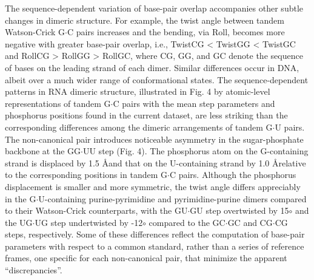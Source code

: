 The  sequence-dependent variation of  base-pair overlap  accompanies
other  subtle changes  in dimeric  structure. For  example,  the twist
angle between  tandem Watson-Crick  G$\cdot$C pairs increases  and the
bending,  via Roll,  becomes  more negative  with  greater base-pair
overlap,  i.e., TwistCG  < TwistGG  < TwistGC  and RollCG  >  RollGG >
RollGC,  where CG,  GG, and  GC denote  the sequence  of bases  on the
leading strand of each dimer. Similar differences occur in DNA, albeit
over  a  much  wider  range  of  conformational  states.  The
sequence-dependent patterns in RNA dimeric structure, illustrated in
Fig. 4 by atomic-level  representations of tandem G$\cdot$C pairs with
the mean step parameters and phosphorus positions found in the current
dataset, are less striking  than the corresponding differences among
the dimeric arrangements of  tandem G$\cdot$U pairs. The non-canonical
pair introduces  noticeable asymmetry in  the sugar-phosphate backbone
at  the  GG$\cdot$UU  step  (Fig.  4).  The  phosphorus  atom  on  the
G-containing strand is displaced by 1.5 \AA and that on the U-containing
strand  by 1.0  \AA relative  to the  corresponding positions  in tandem
G$\cdot$C pairs. Although the phosphorus displacement is smaller and
more  symmetric,  the  twist   angle  differs  appreciably  in  the
G$\cdot$U-containing purine-pyrimidine and pyrimidine-purine dimers
compared to their Watson-Crick counterparts, with the GU$\cdot$GU step
overtwisted  by 15$\circ$  and  the UG$\cdot$UG  step undertwisted  by
-12$\circ$ compared to the GC$\cdot$GC and CG$\cdot$CG steps, respectively. Some
of these  differences reflect the computation  of base-pair parameters
with respect to  a common standard, rather than  a series of reference
frames, one  specific for each  non-canonical pair, that  minimize the
apparent ``discrepancies''.


